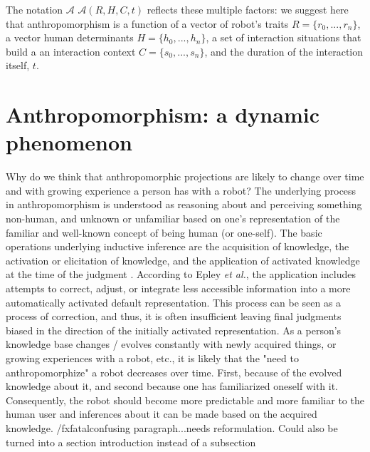 \documentclass{frontiersSCNS} %
\newcommand{\Ant}[1][]{%
      \ifthenelse{\isempty{#1}}%
        {$\mathcal{A}$}
        {$\mathcal{A}(#1)$}
}
\begin{document}
The notation \Ant[R,H,C,t] reflects these multiple factors: we suggest here that
anthropomorphism is a function of a vector of robot's traits $R = \{r_0,...,r_n\}$, a vector human
determinants $H = \{h_0,...,h_n\}$, a set of interaction situations that build a
an interaction context $C = \{s_0,...,s_n\}$, and the duration of the
interaction itself, $t$.

%
%
%
%
%
%
%
%
%

\section{Anthropomorphism: a dynamic phenomenon}
\label{sec:our-ideas}

Why do we think that anthropomorphic projections are likely to change over time
and with growing experience a person has with a robot? The underlying process in
anthropomorphism is understood as reasoning about and perceiving something
non-human, and unknown or unfamiliar based on one's representation of the
familiar and well-known concept of being human (or one-self). The basic
operations underlying inductive inference are the acquisition of knowledge, the
activation or elicitation of knowledge, and the application of activated
knowledge at the time of the judgment \cite{epley_when_2008}. According to Epley
\textit{et al.}, the application includes attempts to correct, adjust, or
integrate less accessible information into a more automatically activated
default representation. This process can be seen as a process of correction, and
thus, it is often insufficient leaving final judgments biased in the direction
of the initially activated representation. As a person's knowledge base changes
/ evolves constantly with newly acquired things, or growing experiences with a
robot, etc., it is likely that the "need to anthropomorphize" a robot decreases
over time. First, because of the evolved knowledge about it, and second because
one has familiarized oneself with it. Consequently, the robot should become more
predictable and more familiar to the human user and inferences about it can be
made based on the acquired knowledge.  /fxfatal{confusing paragraph...needs
reformulation. Could also be turned into a section introduction instead of a
subsection}
\end{document}
